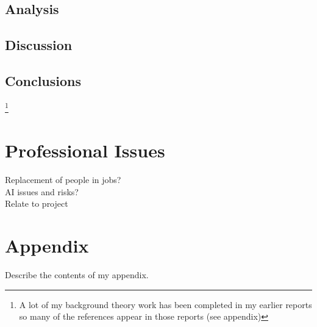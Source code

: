 \documentclass[]{final_report}
\begin{document}
\section{Analysis}

\section{Discussion}

\section{Conclusions}

\newpage
{}

\footnote{A lot of my background theory work has been completed in my earlier reports so many of the references appear in those reports (see appendix)}
\label{endpage}

\chapter{Professional Issues}
Replacement of people in jobs?\\
AI issues and risks?\\
Relate to project

\chapter{Appendix}
\label{appendix}
Describe the contents of my appendix.







\begin{figure}
	
	\caption{\label{appendix:web_app_testing}}
\end{figure}
\end{document}
